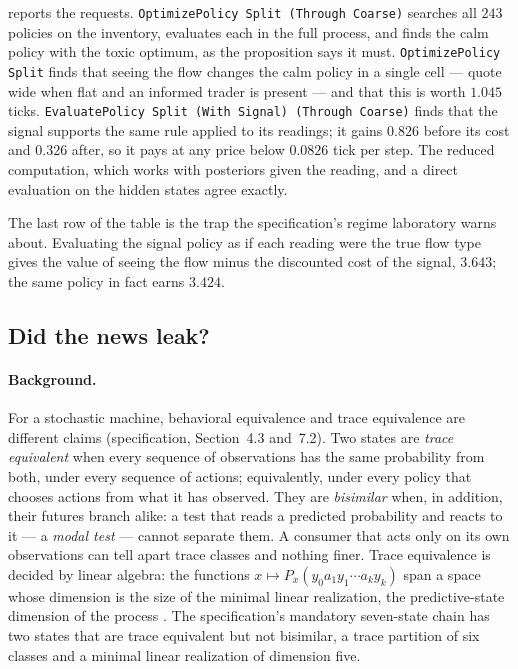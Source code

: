 \documentclass[11pt]{article}
\newcommand{\code}[1]{\texttt{#1}}
\newcommand{\spec}[1]{specification, Section~#1}
\theoremstyle{definition}
\theoremstyle{plain}
\begin{document}
 reports the requests. \code{OptimizePolicy Split (Through Coarse)} searches all
$243$ policies on the inventory, evaluates each in the full process, and finds the calm policy with the
toxic optimum, as the proposition says it must. \code{OptimizePolicy Split} finds that seeing the flow
changes the calm policy in a single cell --- quote wide when flat and an informed trader is present ---
and that this is worth $1.045$ ticks. \code{EvaluatePolicy Split (With Signal) (Through Coarse)} finds that
the signal supports the same rule applied to its readings; it gains $0.826$ before its cost and $0.326$
after, so it pays at any price below $0.0826$ tick per step. The reduced computation, which works with
posteriors given the reading, and a direct evaluation on the hidden states agree exactly.

The last row of the table is the trap the specification's regime laboratory warns about. Evaluating
the signal policy as if each reading were the true flow type gives the value of seeing the flow minus the
discounted cost of the signal, $3.643$; the same policy in fact earns $3.424$.

\subsection{Did the news leak?}

\paragraph{Background.} For a stochastic machine, behavioral equivalence and trace equivalence are
different claims (\spec{4.3} and~7.2). Two states are \emph{trace equivalent} when every sequence of
observations has the same probability from both, under every sequence of actions; equivalently, under
every policy that chooses actions from what it has observed. They are \emph{bisimilar} when, in
addition, their futures branch alike: a test that reads a predicted probability and reacts to it --- a
\emph{modal test} --- cannot separate them. A consumer that acts only on its own observations can
tell apart trace classes and nothing finer. Trace equivalence is decided by linear algebra: the functions $x\mapsto
P_x(y_0a_1y_1\cdots a_ky_k)$ span a space whose dimension is the size of the minimal linear realization,
the predictive-state dimension of the process \cite{schutzenberger,tzeng,psr,oom}. The specification's
mandatory seven-state chain has two states that are trace equivalent but not bisimilar, a trace
partition of six classes and a minimal linear realization of dimension five.
\end{document}
